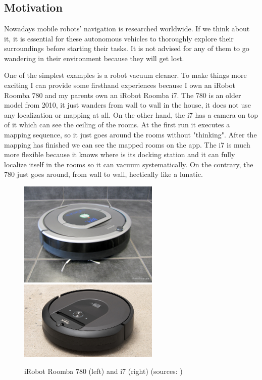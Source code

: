 \chapter{\bevezetes}

\section{Motivation}

Nowadays mobile robots' navigation is researched worldwide. If we think about it, it is essential for these autonomous vehicles to thoroughly explore their surroundings before starting their tasks. It is not advised for any of them to go wandering in their environment because they will get lost.

One of the simplest examples is a robot vacuum cleaner. To make things more exciting I can provide some firsthand experiences because I own an iRobot Roomba 780 and my parents own an iRobot Roomba i7. The 780 is an older model from 2010, it just wanders from wall to wall in the house, it does not use any localization or mapping at all. On the other hand, the i7 has a camera on top of it which can see the ceiling of the rooms. At the first run it executes a mapping sequence, so it just goes around the rooms without "thinking". After the mapping has finished we can see the mapped rooms on the app. The i7 is much more flexible because it knows where is its docking station and it can fully localize itself in the rooms so it can vacuum systematically. On the contrary, the 780 just goes around, from wall to wall, hectically like a lunatic.

\begin{figure}[H]
	\centering
	\includegraphics[width=67mm, keepaspectratio]{figures/iRobot_roomba_780.jpg}\hspace{1cm}
	\includegraphics[width=67mm, keepaspectratio]{figures/iRobot_roomba_i7.jpg}\\\vspace{5mm}
	\caption{iRobot Roomba 780 (left) and i7 (right) (sources: \cite{roomba780}\cite{roombai7})}
	\label{fig:Roombas}
\end{figure}

